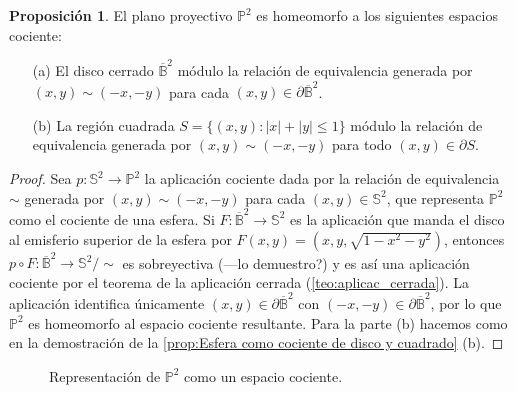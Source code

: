 \documentclass[10pt]{report}
\theoremstyle{definition}
\newtheorem{prop}[defin]{Proposición}
\begin{document}
\begin{prop}%
\label{prop:proyectivo_cociente_cuadrado}
El plano proyectivo $\mathbb{P}^2$ es homeomorfo a los siguientes espacios cociente:
\begin{itemize}
\item[(a)] El disco cerrado $\overline{\mathbb{B}}^2$ módulo la relación de equivalencia generada por $(x,y) \sim (-x,-y)$ para cada $(x,y)\in \partial \overline{\mathbb{B}}^2$.
\item[(b)] La región cuadrada $S=\{(x,y):|x|+|y|\leq 1\} $ módulo la relación de equivalencia generada por $(x,y)\sim (-x,-y) $ para todo $(x,y)\in \partial S$.
\end{itemize}
\end{prop}
\begin{proof}
Sea $p:\mathbb{S}^2 \to \mathbb{P}^2$ la aplicación cociente dada por la relación de equivalencia $\sim$ generada por $(x,y) \sim (-x,-y)$ para cada $(x,y)\in \mathbb{S}^2$, que representa $\mathbb{P}^2$ como el cociente de una esfera. %
Si $F:\overline{\mathbb{B}}^2 \to \mathbb{S}^2$ es la aplicación que manda el disco al emisferio superior de la esfera por $F(x,y)=(x,y,\sqrt{1-x^2-y^2})$, entonces $p\circ F:\overline{\mathbb{B}}^2 \to \mathbb{S}^2/\sim$ es sobreyectiva (---lo demuestro?) y es así una aplicación cociente por el teorema de la aplicación cerrada (\autoref{teo:aplicac_cerrada}). La aplicación identifica únicamente $(x,y)\in \partial \overline{\mathbb{B}}^2$ con $(-x,-y)\in \partial \overline{\mathbb{B}}^2$, por lo que $\mathbb{P}^2$ es homeomorfo al espacio cociente resultante.
Para la parte (b) hacemos como en la demostración de la \autoref{prop:Esfera como cociente de disco y cuadrado} (b). 
\end{proof}


\begin{figure}[h]%
\begin{center}
\caption{Representación de $\mathbb{P}^2$ como un espacio cociente.\label{fig:plano_proyectivo_cuadrado}}
\end{center}
\end{figure}
\end{document}
